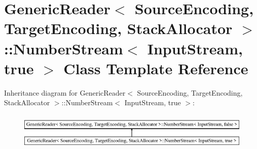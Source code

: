 \hypertarget{class_generic_reader_1_1_number_stream_3_01_input_stream_00_01true_01_4}{}\section{Generic\+Reader$<$ Source\+Encoding, Target\+Encoding, Stack\+Allocator $>$\+:\+:Number\+Stream$<$ Input\+Stream, true $>$ Class Template Reference}
\label{class_generic_reader_1_1_number_stream_3_01_input_stream_00_01true_01_4}
Inheritance diagram for Generic\+Reader$<$ Source\+Encoding, Target\+Encoding, Stack\+Allocator $>$\+:\+:Number\+Stream$<$ Input\+Stream, true $>$\+:\begin{figure}[H]
\begin{center}
\leavevmode
\includegraphics[height=1.783440cm]{class_generic_reader_1_1_number_stream_3_01_input_stream_00_01true_01_4}
\end{center}
\end{figure}
